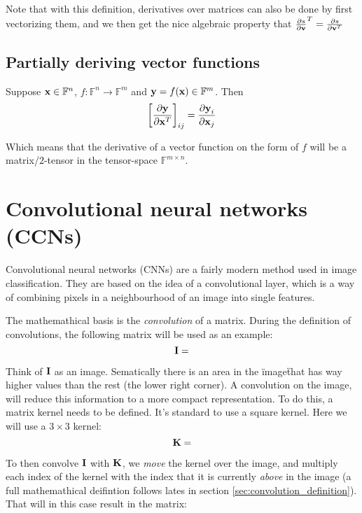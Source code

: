 Note that with this definition, derivatives over matrices can also be done by first vectorizing them,
and we then get the nice algebraic property that  $\frac{\partial s}{\partial \textbf{v}}^{T} = \frac{\partial s}{\partial \textbf{v}^{T}}$


\subsection{Partially deriving vector functions}
Suppose $\textbf{x} \in \mathbb{F}^n$,
$f: \mathbb{F}^n \rightarrow \mathbb{F}^m$ and
$\textbf{y} = f(\textbf{x}) \in \mathbb{F}^m$.
Then
\begin{equation}
    \left[ \frac{\partial \textbf{y}}{\partial \textbf{x}^T} \right]_{ij} =
    \frac{\partial \textbf{y}_i}{\partial \textbf{x}_j}
\end{equation}

Which means that the derivative of a vector function on the form of $f$ will be a matrix/$2$-tensor
in the tensor-space $\mathbb{F}^{m\times n}$.


\section{Convolutional neural networks (CCNs)} \label{sec:convolutional_neural_networks}
Convolutional neural networks (CNNs) are a fairly modern method used in image classification.
They are based on the idea of a convolutional layer, which is a way of combining pixels in a
neighbourhood of an image into single features.

The mathemathical basis is the \textit{convolution} of a matrix.
During the definition of convolutions, the following matrix will be used as an example:
\begin{equation}
    \textbf{I} = 
\end{equation}

Think of $\textbf{I}$ as an image.
Sematically there is an area in the \"image\" that has way higher values than the rest
(the lower right corner).
A convolution on the image, will reduce this information to a more compact representation.
To do this, a matrix kernel needs to be defined. It's standard to use a square kernel.
Here we will use a $3 \times 3$ kernel:
\begin{equation}
    \matsym{K} =
    
\end{equation}

To then convolve $\textbf{I}$ with $\textbf{K}$, we \textit{move} the kernel over the image,
and multiply each index of the kernel with the index that it is currently \textit{above} in the image
(a full mathemathical deifintion follows lates in section \ref{sec:convolution_definition}).
That will in this case result in the matrix:
\begin{equation}
    
\end{equation}


